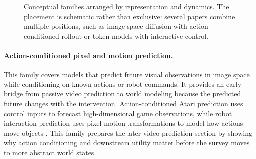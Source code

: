 \begin{figure}[t]
\centering
{}
\caption{Conceptual families arranged by representation and dynamics. The placement is schematic rather than exclusive: several papers combine multiple positions, such as image-space diffusion with action-conditioned rollout or token models with interactive control.}
\label{fig:taxonomy_grid}
\end{figure}

\paragraph{Action-conditioned pixel and motion prediction.}
This family covers models that predict future visual observations in image space while conditioning on known actions or robot commands. It provides an early bridge from passive video prediction to world modeling because the predicted future changes with the intervention. Action-conditioned Atari prediction uses control inputs to forecast high-dimensional game observations, while robot interaction prediction uses pixel-motion transformations to model how actions move objects \cite{oh2015_action_conditional_video_prediction_prov,finn2016_physical_interaction_video_prediction_prov}. This family prepares the later video-prediction section by showing why action conditioning and downstream utility matter before the survey moves to more abstract world states.

